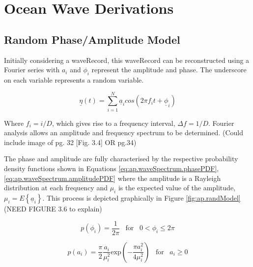 \chapter{Ocean Wave Derivations}
\label{ap:oceanWaves}

\section{Random Phase/Amplitude Model} \label{sec:ap.oceanWaves.randModel}

Initially considering a \gls{waveRecord}, this \gls{waveRecord} can be reconstructed using a Fourier series with $a_{i}$ and $\phi_{i}$ represent the amplitude and phase. The underscore on each variable represents a random variable.

\begin{equation} \label{eq:ap.waveSpectrum.fourierSeries}
    \underline{\eta}(t) = \sum_{i=1}^{N}\underline{a}_{i}cos(2\pi f_{i}t + \underline{\phi}_{i})
\end{equation}

Where $f_{i}=i/D$, which gives rise to a frequency interval, $\Delta f=1/D$. Fourier analysis allows an amplitude and frequency spectrum to be determined.
(Could include image of pg. 32 [Fig. 3.4] OR pg.34)

The phase and amplitude are fully characterised by the respective probability density functions shown in Equations \ref{eq:ap.waveSpectrum.phasePDF},\ref{eq:ap.waveSpectrum.amplitudePDF} where the amplitude is a Rayleigh distribution at each frequency and $\mu_{i}$ is the expected value of the amplitude, $\mu_{i}= E\left \{  \underline{a}_{i}\right \}$. This process is depicted graphically in Figure \ref{fig:ap.randModel}
(NEED FIGURE 3.6 to explain)


\begin{equation} \label{eq:ap.waveSpectrum.phasePDF}
    p(\phi_{i}) = \frac{1}{2\pi} \; \; \; \text{for} \; \; \;  0 < \phi_{i} \leq 2\pi
\end{equation}

\begin{equation} \label{eq:ap.waveSpectrum.amplitudePDF}
    p(a_{i}) = \frac{\pi}{2}\frac{a_{i}}{\mu^{2}_{i}}\text{exp}\left (-\frac{\pi a^{2}_{i}}{4\mu^{2}_{i}}\right ) \; \; \; \text{for} \; \; \;  a_{i} \geq 0
\end{equation}

